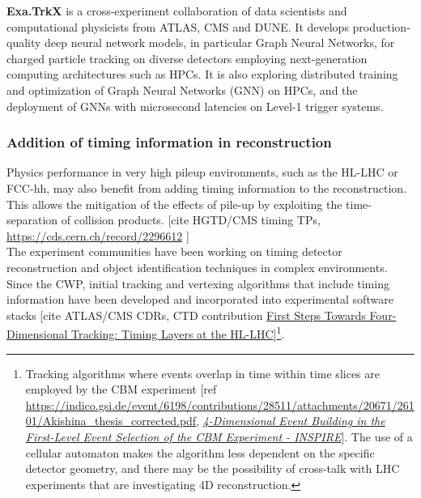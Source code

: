 \documentclass[10pt,a4paper]{article}
\begin{document}
\textbf{Exa.TrkX} is a cross-experiment collaboration of data scientists
and computational physicists from ATLAS, CMS and DUNE. It develops
production-quality deep neural network models, in particular Graph
Neural Networks, for charged particle tracking on diverse detectors
employing next-generation computing architectures such as HPCs. It is
also exploring distributed training and optimization of Graph Neural
Networks (GNN) on HPCs, and the deployment of GNNs with microsecond
latencies on Level-1 trigger systems.

\hypertarget{addition-of-timing-information-in-reconstruction}{%
\subsubsection{Addition of timing information in
reconstruction}\label{addition-of-timing-information-in-reconstruction}}

Physics performance in very high pileup environments, such as the HL-LHC
or FCC-hh, may also benefit from adding timing information to the
reconstruction. This allows the mitigation of the effects of pile-up by
exploiting the time-separation of collision products. {[}cite HGTD/CMS
timing TPs,
\href{https://cds.cern.ch/record/2296612}{{https://cds.cern.ch/record/2296612}}
{]}\\
The experiment communities have been working on timing detector
reconstruction and object identification techniques in complex
environments. Since the CWP, initial tracking and vertexing algorithms
that include timing information have been developed and incorporated
into experimental software stacks {[}cite ATLAS/CMS CDRs, CTD
contribution
\href{https://indico.cern.ch/event/658267/contributions/2870293/attachments/1620243/2577412/TimingCTD_LindseyGray_20032018.pdf}{{First
Steps Towards Four-Dimensional Tracking: Timing Layers at the
HL-LHC}}{]}\footnote{Tracking algorithms where events overlap in time
  within time slices are employed by the CBM experiment {[}ref
  \href{https://indico.gsi.de/event/6198/contributions/28511/attachments/20671/26101/Akishina_thesis_corrected.pdf}{{https://indico.gsi.de/event/6198/contributions/28511/attachments/20671/26101/Akishina\_thesis\_corrected.pdf}},
  \href{https://inspirehep.net/literature/1414007}{\emph{{4-Dimensional
  Event Building in the First-Level Event Selection of the CBM
  Experiment - INSPIRE}}}{]}. The use of a cellular automaton makes the
  algorithm less dependent on the specific detector geometry, and there
  may be the possibility of cross-talk with LHC experiments that are
  investigating 4D reconstruction.}.
\end{document}
